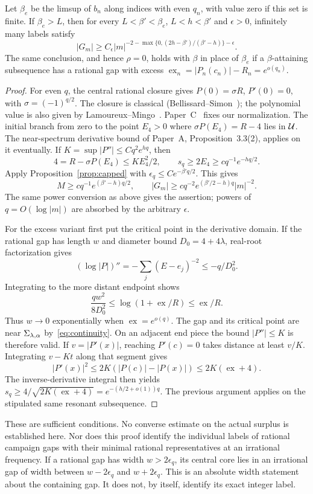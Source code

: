 \begin{proposition}\label{prop:even}
Let $\beta_e$ be the limsup of $b_n$ along indices with even $q_n$, with value zero if this set is finite. If $\beta_e>L$, then for every $L<\beta'<\beta_e$, $L<h<\beta'$ and $\epsilon>0$, infinitely many labels satisfy
\[
 |G_m|\ge C_\epsilon
 |m|^{-2-\max\{0,(2h-\beta')/(\beta'-h)\}-\epsilon}.
\]
The same conclusion, and hence $\rho=0$, holds with $\beta$ in place of $\beta_e$ if a $\beta$-attaining subsequence has a rational gap with excess
$\operatorname{ex}_n=|P_n(c_n)|-R_n=e^{o(q_n)}$.
\end{proposition}
\begin{proof}
For even $q$, the central rational closure gives $P(0)=\sigma R$, $P'(0)=0$, with $\sigma=(-1)^{q/2}$. The closure is classical (Bellissard--Simon~\cite{BellissardSimon1982}); the polynomial value is also given by Lamoureux--Mingo~\cite{LamoureuxMingo2007}. Paper~C~\cite[Corollary~7.2]{PaperC} fixes our normalization. The initial branch from zero to the point $E_4>0$ where $\sigma P(E_4)=R-4$ lies in $\mathcal U$. The near-spectrum derivative bound of Paper~A, Proposition~3.3(2), applies on it eventually. If $K=\sup|P''|\le Cq^2e^{hq}$, then
\[
 4=R-\sigma P(E_4)\le KE_4^2/2,\qquad
 s_q\ge2E_4\ge cq^{-1}e^{-hq/2}.
\]
Apply Proposition~\ref{prop:capped} with $\epsilon_q\le C e^{-\beta'q/2}$. This gives
\[
 M\ge cq^{-1}e^{(\beta'-h)q/2},\qquad
 |G_m|\ge cq^{-2}e^{(\beta'/2-h)q}|m|^{-2}.
\]
The same power conversion as above gives the assertion; powers of $q=O(\log|m|)$ are absorbed by the arbitrary $\epsilon$.

For the excess variant first put the critical point in the derivative domain. If the rational gap has length $w$ and diameter bound $D_0=4+4\lambda$, real-root factorization gives
\[
 (\log|P|)''=-\sum_j(E-e_j)^{-2}\le-q/D_0^2.
\]
Integrating to the more distant endpoint shows
\[
 \frac{qw^2}{8D_0^2}\le\log(1+\operatorname{ex}/R)
 \le\operatorname{ex}/R.
\]
Thus $w\to0$ exponentially when $\operatorname{ex}=e^{o(q)}$. The gap and its critical point are near $\Sigma_{\lambda,\alpha}$ by~\eqref{eq:continuity}. On an adjacent end piece the bound $|P''|\le K$ is therefore valid. If $v=|P'(x)|$, reaching $P'(c)=0$ takes distance at least $v/K$. Integrating $v-Kt$ along that segment gives
\[
 |P'(x)|^2\le2K(|P(c)|-|P(x)|)
          \le2K(\operatorname{ex}+4).
\]
The inverse-derivative integral then yields $s_q\ge4/\sqrt{2K(\operatorname{ex}+4)}=e^{-(h/2+o(1))q}$. The previous argument applies on the stipulated same resonant subsequence.
\end{proof}

These are sufficient conditions. No converse estimate on the actual surplus is established here. Nor does this proof identify the individual labels of rational campaign gaps with their minimal rational representatives at an irrational frequency. If a rational gap has width $w>2\epsilon_q$, its central core lies in an irrational gap of width between $w-2\epsilon_q$ and $w+2\epsilon_q$. This is an absolute width statement about the containing gap. It does not, by itself, identify its exact integer label.

\label{end:surplus}
